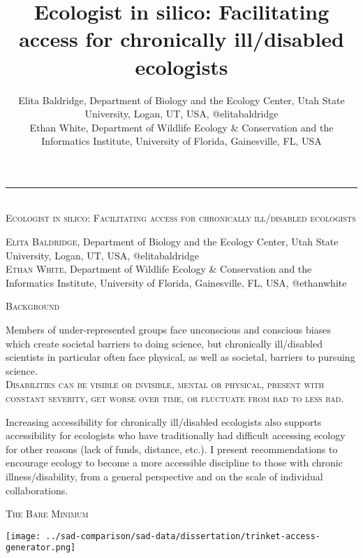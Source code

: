 \documentclass{beamer}
\author{Elita Baldridge, Department of Biology and the Ecology Center, Utah State University, Logan, UT, USA, @elitabaldridge\\Ethan White, Department of Wildlife Ecology \& Conservation and the Informatics Institute, University of Florida, Gainesville, FL, USA}
\title[17pt]{Ecologist in silico: Facilitating access for chronically ill/disabled ecologists}
\date{}
\begin{document}
\begin{center} 
\begin{huge}
\rule{\linewidth}{3cm}
\textsc{%
\\Ecologist in silico: Facilitating access for chronically ill/disabled ecologists\\
 }
\end{huge}  
\begin{large}
\textsc{Elita Baldridge}, Department of Biology and the Ecology Center, Utah State University, Logan, UT, USA, @elitabaldridge\\  
\textsc{Ethan White}, Department of Wildlife Ecology \& Conservation and the Informatics Institute, University of Florida, Gainesville, FL, USA, @ethanwhite\\
\end{large}
\end{center}
\begin{minipage}{0.25\linewidth}
\hspace{0.5cm}
\begin{Large}
\begin{center}
\textsc{Background}
\end{center}
\end{Large}
Members of under-represented groups face unconscious and conscious biases which create societal barriers to doing science, but chronically ill/disabled scientists in particular often face physical, as well as societal, barriers to pursuing science.\\ 

\textsc{Disabilities can be visible or invisible, mental or physical, present with constant severity, get worse over time, or fluctuate from bad to less bad.\\ } 

Increasing accessibility for chronically ill/disabled ecologists also supports accessibility for ecologists who have traditionally had difficult accessing ecology for other reasons (lack of funds, distance, etc.). I present recommendations to encourage ecology to become a more accessible discipline to those with chronic illness/disability, from a general perspective and on the scale of individual collaborations. 
\begin{Large}
\begin{center}
\textsc{The Bare Minimum}
\end{center}
\end{Large}
\begin{center}
\texttt{[image: ../sad-comparison/sad-data/dissertation/trinket-access-generator.png]}
\end{center}
\end{minipage}
\end{document}
